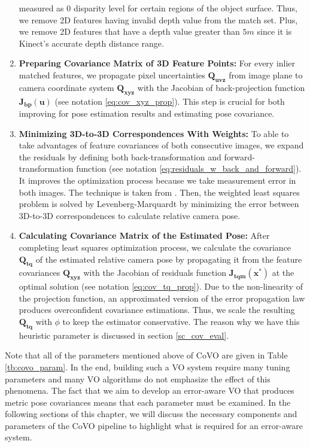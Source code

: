 \documentclass[a4paper]{report}
\numberwithin{figure}{section}
\begin{document}
\begin{enumerate}
    measured as 0 disparity level for certain regions of the object surface.
    Thus, we remove 2D features having invalid depth value from the match set.
    Plus, we remove 2D features that have a depth value greater than $5m$ since
    it is Kinect's accurate depth distance range. 
  \item \textbf{Preparing Covariance Matrix of 3D Feature Points:} For every
    inlier matched features, we propagate pixel uncertainties
    $\mathbf{Q_{uvz}}$ from image plane to camera coordinate system
    $\mathbf{Q_{xyz}}$ with the Jacobian of back-projection function
    $\mathbf{J_{bp}}(\mathbf{u})$ (see notation \eqref{eq:cov_xyz_prop}). This
    step is crucial for both improving for pose estimation results and
    estimating pose covariance.  
  \item \textbf{Minimizing 3D-to-3D Correspondences With Weights:} To able to
    take advantages of feature covariances of both consecutive images, we
    expand the residuals by defining both back-transformation and 
    forward-transformation
    function (see notation \eqref{eq:residuals_w_back_and_forward}).  It 
    improves
    the optimization process because we take measurement error in both images.
    The technique is taken from \parencite[see][101]{RichardHartley2003}.  
    Then, 
    the
    weighted least squares problem is solved by Levenberg-Marquardt by
    minimizing the error between 3D-to-3D correspondences to calculate relative
    camera pose.  
  \item \textbf{Calculating Covariance Matrix of the Estimated Pose:} After
    completing least squares optimization process, we calculate the covariance
    $\mathbf{Q_{tq}}$ of the estimated relative camera pose by propagating it
    from the feature covariances $\mathbf{Q_{xyz}}$ with the Jacobian of
    residuals function $\mathbf{J_{tqm}}(\mathbf{x^*})$ at the optimal 
    solution (see
    notation \eqref{eq:cov_tq_prop}).  Due to the non-linearity of the 
    projection
    function, an approximated version of the error propagation law produces
    overconfident covariance estimations. Thus, we scale the resulting
    $\mathbf{Q_{tq}}$ with $\phi$ to keep the estimator conservative.  The
    reason why we have this heuristic parameter is discussed in section
    \ref{sc_cov_eval}.  
\end{enumerate}

Note that all of the parameters mentioned above of CoVO are given in Table 
\ref{tb:covo_param}.  In the end, building such a VO system
require many tuning parameters and many VO algorithms do not emphasize the
effect of this phenomena.  The fact that we aim to develop an error-aware VO
that produces metric pose covariances means that each parameter must be
examined.  In the following sections of this chapter, we will discuss the
necessary components and parameters of the CoVO pipeline to highlight what is
required for an error-aware system.
\end{document}
